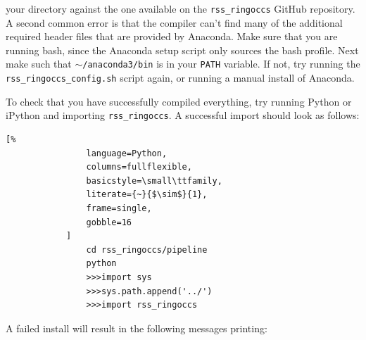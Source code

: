 \documentclass[titlepage, 12pt]{article}
\begin{document}
            your directory against the one available on the \texttt{rss\_ringoccs} GitHub repository.
            A second common error is that the compiler can't
            find many of the additional required header files that
            are provided by Anaconda. Make sure that you are running
            bash, since the Anaconda setup script only sources the
            bash profile. Next make such that
            \texttt{$\sim$/anaconda3/bin} is in your
            \texttt{PATH} variable. If not, try running the
            \texttt{rss\_ringoccs\_config.sh} script again, or
            running a manual install of Anaconda.
            \par\hfill\par
            To check that you have successfully compiled everything,
            try running Python or iPython and importing
            \texttt{rss\_ringoccs}. A successful import should look
            as follows:
            \begin{lstlisting}[%
                language=Python,
                columns=fullflexible,
                basicstyle=\small\ttfamily,
                literate={~}{$\sim$}{1},
                frame=single,
                gobble=16
            ]
                cd rss_ringoccs/pipeline
                python
                >>>import sys
                >>>sys.path.append('../')
                >>>import rss_ringoccs
            \end{lstlisting}
            A failed install will result in the following messages
            printing:
\end{document}

